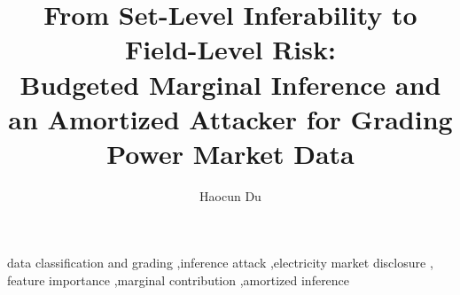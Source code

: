 \documentclass[preprint,12pt]{elsarticle}
\begin{document}
\begin{frontmatter}

\title{From Set-Level Inferability to Field-Level Risk:\\ Budgeted Marginal Inference and an Amortized
Attacker for Grading Power Market Data}

\author{Haocun Du}
\address{(affiliation to be completed)}



\begin{keyword}
data classification and grading \sep inference attack \sep electricity market disclosure \sep
feature importance \sep marginal contribution \sep amortized inference
\end{keyword}

\end{frontmatter}









\appendix

\clearpage



\end{document}
